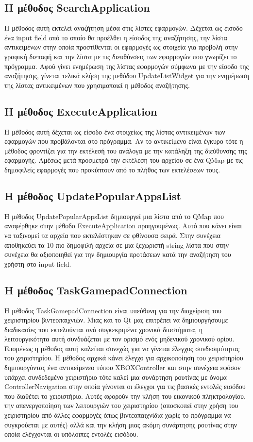 \subsection{Η μέθοδος SearchApplication}
Η μέθοδος αυτή εκτελεί αναζήτηση μέσα στις λίστες εφαρμογών. Δέχεται ως είσοδο ένα
input field από το οποίο θα προέλθει η είσοδος της αναζήτησης, την λίστα αντικειμένων
στην οποία προστίθενται οι εφαρμογές ως στοιχεία για προβολή στην γραφική διεπαφή και
την λίστα με τις διευθύνσεις των εφαρμογών που γνωρίζει το πρόγραμμα. Αφού γίνει ενημέρωση
της λίστας εφαρμογών σύμφωνα με την είσοδο της αναζήτησης, γίνεται τελικά κλήση της 
μεθόδου UpdateListWidget για την ενημέρωση της λίστας αντικειμένων που χρησιμοποιεί
η μέθοδος αναζήτησης. 


\subsection{Η μέθοδος ExecuteApplication}
Η μέθοδος αυτή δέχεται ως είσοδο ένα στοιχείως της λίστας αντικειμένων των εφαρμογών
που προβάλονται στο πρόγραμμα. Αν το αντικείμενο είναι έγκυρο τότε η μέθοδος φροντίζει
για την εκτέλεσή του ανάλογα με την κατάληξη της διεύθυνσης της εφαρμογής. Αμέσως μετά
προσμετρά την εκτέλεση του αρχείου σε ένα QMap με τις δημοφιλείς εφαρμογές που προκύπτουν
από το πλήθος των εκτελέσεων τους.


\subsection{Η μέθοδος UpdatePopularAppsList}
Η μέθοδος UpdatePopularAppsList δημιουργεί μια λίστα από το QMap που αναφέρθηκε στην
μέθοδο ExecuteApplication προηγουμένως. Αυτό που κάνει είναι να ταξινομεί τα αρχεία που
εκτελέστηκαν σε φθίνουσα σειρά. Στην συνέχεια αποθηκεύει τα 10 πιο δημοφιλή αρχεία σε
μια ξεχωριστή string λίστα που στην συνέχεια θα αξιοποιηθεί για την δημιουργία προτάσεων
κατά την αναζήτηση του χρήστη στο input field.


\subsection{Η μέθοδος TaskGamepadConnection}
Η μέθοδος TaskGamepadConnection είναι υπεύθυνη για την διαχείριση του χειριστηρίου βιντεοπαιχνιών. 
Μιας και το Qt μας επιτρέπει να δημιουργήσουμε διαδικασίες που εκτελούνται ανά συγκεκριμένα 
χρονικά διαστήματα, η λειτουργικότητα αυτή συνδυάζεται με τον ορισμό ενός μηδενικού χρονικού 
ορίου. Επομένως η μέθοδος αυτή καλείται συνεχώς για να γίνεται έλεγχος συνδεσιμότητας του
χειριστηρίου. Η μέθοδος αρχικά κάνει έλεγχο για αρχικοποίηση του χειριστηρίου δημιουργόντας ένα 
αντικείμενεο τύπου XBOXController και στην συνέχεια εφόσον υπάρχει συνδεδεμένο χειριστήριο τότε 
καλεί μια συνάρτηση ρουτίνας με όνομα ControllerNavigation στην οποία γίνονται οι έλεγχοι για τις 
βασικές εντολές εισόδου που διαθέτει το χειριστήριο. Αυτές αφορούν την κλήση του εικονικού πληκτρολογίου, 
την απενεργοποίηση των λειτουργιών του χειριστηρίου (αποσκοπεί στην χρήση του χειριστηρίου από άλλες 
εφαρμογές όπως βιντεοπαιχνίδια χωρίς το πρόγραμμα να συγκρούεται με αυτές) αλλά και την κλήση μιας 
ακόμη συνάρτησης ρουτίνας στην οποία ελέγχονται οι υπόλοιπες εντολές εισόδου.




